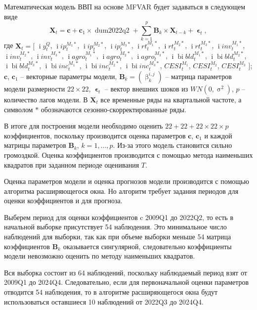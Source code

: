 \documentclass[a4paper, 14pt]{extreport}
\numberwithin{equation}{section}
\renewcommand{\beta}{\upbeta}
\renewcommand{\epsilon}{\upvarepsilon}
\renewcommand{\sigma}{\upsigma}
\renewcommand{\i}{\operatorname{i}}
\newcommand{\bi}{\operatorname{bi}}
\numberwithin{equation}{section}
\begin{document}
	Математическая модель ВВП на основе MFVAR будет задаваться в следующем виде
	\begin{equation}
		\label{eq:mfvar-1}
		\mathbf X_t = \mathbf c + \mathbf c_1 \times \operatorname{dum2022q2} + \sum_{k=1}^{p}\mathbf B_k \times \mathbf X_{t-k} + \mathbf \epsilon_t,
	\end{equation}
	где
	$\mathbf X_t = \Big[$
	$\i y_t^{Q}$,
	$\i ip_{t}^{M_1*}$,
	$\i ip_{t}^{M_2*}$,
	$\i ip_{t}^{M_3*}$,
	$\i rt_{t}^{M_1*}$,
	$\i rt_{t}^{M_2*}$,
	$\i rt_{t}^{M_3*}$,
	$\i inv_{t}^{M_1*}$,
	$\i inv_{t}^{M_2*}$,
	$\i inv_{t}^{M_3*}$,
	$\i agro_{t}^{M_1*}$,
	$\i agro_{t}^{M_2*}$,
	$\i agro_{t}^{M_3*}$,
	$\i \bi bld_{t}^{M_1*}$,
	$\i \bi bld_{t}^{M_2*}$,
	$\i \bi bld_{t}^{M_3*}$,
	$\i \bi inc_{t}^{M_1*}$,
	$\i \bi inc_{t}^{M_2*}$,
	$\i \bi inc_{t}^{M_3*}$,
	$CESI_{t}^{M_1}$,
	$CESI_{t}^{M_2}$,
	$CESI_{t}^{M_3}$
	$\Big]$; $\mathbf c$, $\mathbf c_1$ -- векторные параметры модели, $\mathbf B_k = (\beta^{i,j}_k)$ -- матрица параметров модели размерности $22\times 22$, $\mathbf \epsilon_t$ -- вектор внешних шоков из $WN(0,\sigma^2)$, $p$ -- количество лагов модели. В $\mathbf X_t$ все временные ряды на квартальной частоте, а символом $*$ обозначаются сезонно-скорректированные ряды.
	
	В итоге для построения модели необходимо оценить $22 + 22 + 22\times22\times p$ коэффициентов, поскольку производится оценка параметров $\mathbf c$, $\mathbf c_1$ и каждой матрицы параметров $\mathbf B_k$, $k=1,\ldots,p$. Из-за этого модель становится сильно громоздкой. Оценка коэффициентов производится с помощью метода наименьших квадратов при заданном периоде оценивания $T$.
	
	Оценка параметров модели и оценка прогнозов модели производится с помощью алгоритма расширяющегося окна. Но алгоритм требует задания периодов для оценки коэффициентов и для прогноза. 
	
	Выберем период для оценки коэффициентов c 2009Q1 до 2022Q2, то есть в начальной выборке присутствует 54 наблюдения. Это минимальное число наблюдений для выборки, так как при объеме выборки меньше 54 матрица коэффициентов $\mathbf B_k$ оказывается сингулярной, следовательно коэффициенты модели невозможно оценить по методу наименьших квадратов.
	
	Вся выборка состоит из 64 наблюдений, поскольку наблюдаемый период взят от 2009Q1 до 2024Q4. Следовательно, если для первоначальной оценки параметров отводится 54 наблюдения, то в алгоритме расширяющегося окна будут использоваться оставшиеся 10 наблюдений от 2022Q3 до 2024Q4. 
	
\end{document}
